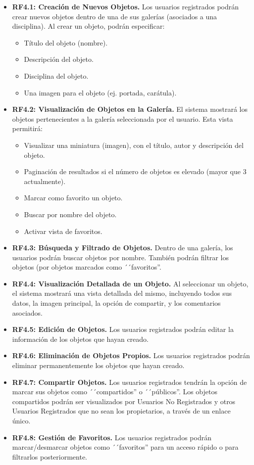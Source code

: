 \begin{itemize}
    \item \textbf{RF4.1: Creación de Nuevos Objetos.} Los usuarios registrados podrán crear nuevos objetos dentro de una de sus galerías (asociados a una disciplina). Al crear un objeto, podrán especificar:
    \begin{itemize}
        \item Título del objeto (nombre).
        \item Descripción del objeto.
        \item Disciplina del objeto.
        \item Una imagen para el objeto (ej. portada, carátula).
    \end{itemize}
    \item \textbf{RF4.2: Visualización de Objetos en la Galería.} El sistema mostrará los objetos pertenecientes a la galería seleccionada por el usuario. Esta vista permitirá:
    \begin{itemize}
        \item Visualizar una miniatura (imagen), con el título, autor y descripción del objeto.
        \item Paginación de resultados si el número de objetos es elevado (mayor que 3 actualmente).
        \item Marcar como favorito un objeto.
        \item Buscar por nombre del objeto.
        \item Activar vista de favoritos.
    \end{itemize}
    \item \textbf{RF4.3: Búsqueda y Filtrado de Objetos.} Dentro de una galería, los usuarios podrán buscar objetos por nombre. También podrán filtrar los objetos (por objetos marcados como ´´favoritos''.
    \item \textbf{RF4.4: Visualización Detallada de un Objeto.} Al seleccionar un objeto, el sistema mostrará una vista detallada del mismo, incluyendo todos sus datos, la imagen principal, la opción de compartir, y los comentarios asociados.
    \item \textbf{RF4.5: Edición de Objetos.} Los usuarios registrados podrán editar la información de los objetos que hayan creado.
    \item \textbf{RF4.6: Eliminación de Objetos Propios.} Los usuarios registrados podrán eliminar permanentemente los objetos que hayan creado.
    \item \textbf{RF4.7: Compartir Objetos.} Los usuarios registrados tendrán la opción de marcar sus objetos como ´´compartidos'' o ´´públicos''. Los objetos compartidos podrán ser visualizados por Usuarios No Registrados y otros Usuarios Registrados que no sean los propietarios, a través de un enlace único.
    \item \textbf{RF4.8: Gestión de Favoritos.} Los usuarios registrados podrán marcar/desmarcar objetos como ´´favoritos'' para un acceso rápido o para filtrarlos posteriormente.
\end{itemize}

